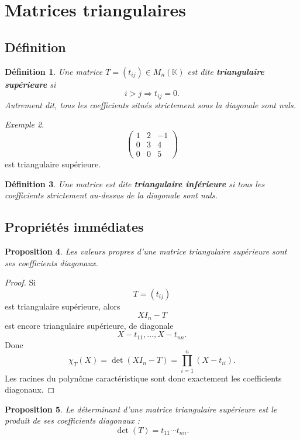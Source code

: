 \documentclass[11pt,a4paper]{article}
\newtheorem{definition}{Définition}[section]
\newtheorem{proposition}[definition]{Proposition}
\theoremstyle{remark}
\newtheorem{exemple}[definition]{Exemple}
\newcommand{\K}{\mathbb{K}}
\begin{document}
\section{Matrices triangulaires}

\subsection{Définition}

\begin{definition}
Une matrice \(T=(t_{ij})\in M_n(\K)\) est dite \textbf{triangulaire supérieure} si
\[
i>j \Longrightarrow t_{ij}=0.
\]
Autrement dit, tous les coefficients situés strictement sous la diagonale sont nuls.
\end{definition}

\begin{exemple}
\[
\begin{pmatrix}
1 & 2 & -1\\
0 & 3 & 4\\
0 & 0 & 5
\end{pmatrix}
\]
est triangulaire supérieure.
\end{exemple}

\begin{definition}
Une matrice est dite \textbf{triangulaire inférieure} si tous les coefficients strictement au-dessus de la diagonale sont nuls.
\end{definition}

\subsection{Propriétés immédiates}

\begin{proposition}
Les valeurs propres d’une matrice triangulaire supérieure sont ses coefficients diagonaux.
\end{proposition}

\begin{proof}
Si
\[
T=(t_{ij})
\]
est triangulaire supérieure, alors
\[
XI_n-T
\]
est encore triangulaire supérieure, de diagonale
\[
X-t_{11},\dots,X-t_{nn}.
\]
Donc
\[
\chi_T(X)=\det(XI_n-T)=\prod_{i=1}^n (X-t_{ii}).
\]
Les racines du polynôme caractéristique sont donc exactement les coefficients diagonaux.
\end{proof}

\begin{proposition}
Le déterminant d’une matrice triangulaire supérieure est le produit de ses coefficients diagonaux :
\[
\det(T)=t_{11}\cdots t_{nn}.
\]
\end{proposition}
\end{document}
